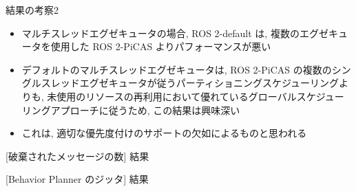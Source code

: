 \begin{frame}{結果の考察2}
    \begin{itemize}
        \item マルチスレッドエグゼキュータの場合, ROS 2-default は, 複数のエグゼキュータを使用した ROS 2-PiCAS よりパフォーマンスが悪い
        \item デフォルトのマルチスレッドエグゼキュータは, ROS 2-PiCAS の複数のシングルスレッドエグゼキュータが従うパーティショニングスケジューリングよりも, 未使用のリソースの再利用において優れているグローバルスケジューリングアプローチに従うため, この結果は興味深い
        \item これは, 適切な優先度付けのサポートの欠如によるものと思われる
    \end{itemize}
\end{frame}

\begin{frame}{[破棄されたメッセージの数] 結果}
\end{frame}

\begin{frame}{[Behavior Planner のジッタ] 結果}
\end{frame}
